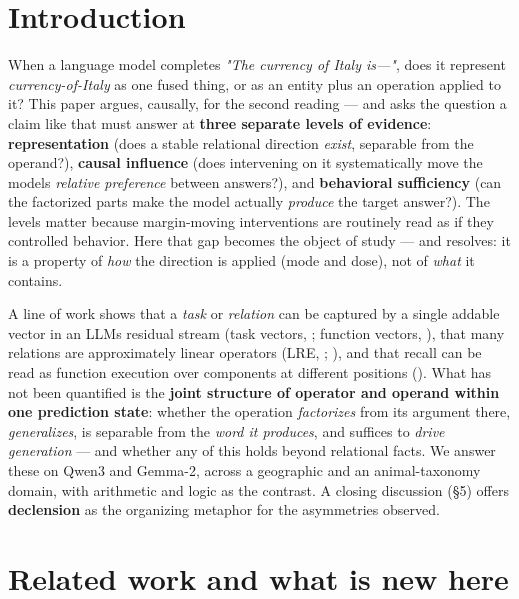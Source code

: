 \section{Introduction}

When a language model completes \emph{"The currency of Italy is---"},
does it represent \emph{currency-of-Italy} as one fused thing, or as an
entity plus an operation applied to it? This paper argues, causally, for
the second reading --- and asks the question a claim like that must
answer at \textbf{three separate levels of evidence}:
\textbf{representation} (does a stable relational direction
\emph{exist}, separable from the operand?), \textbf{causal influence}
(does intervening on it systematically move the model\textquotesingle s
\emph{relative preference} between answers?), and \textbf{behavioral
sufficiency} (can the factorized parts make the model actually
\emph{produce} the target answer?). The levels matter because
margin-moving interventions are routinely read as if they controlled
behavior. Here that gap becomes the object of study --- and resolves: it
is a property of \emph{how} the direction is applied (mode and dose),
not of \emph{what} it contains.

A line of work shows that a \emph{task} or \emph{relation} can be
captured by a single addable vector in an LLM\textquotesingle s residual
stream (task vectors, \citealp{hendel2023icl}; function vectors, \citealp{todd2024function}), that many relations are approximately linear operators (LRE,
\citealp{hernandez2024lre}; \citealp{merullo2024vector}), and that recall can be read
as function execution over components at different positions (\citealp{wang2025functional}). What has not been quantified is the \textbf{joint structure of
operator and operand within one prediction state}: whether the operation
\emph{factorizes} from its argument there, \emph{generalizes}, is
separable from the \emph{word it produces}, and suffices to \emph{drive
generation} --- and whether any of this holds beyond relational facts.
We answer these on Qwen3 and Gemma-2, across a geographic and an
animal-taxonomy domain, with arithmetic and logic as the contrast. A
closing discussion (\S{}5) offers \textbf{declension} as the organizing
metaphor for the asymmetries observed.

\section{Related work and what is new
here}

